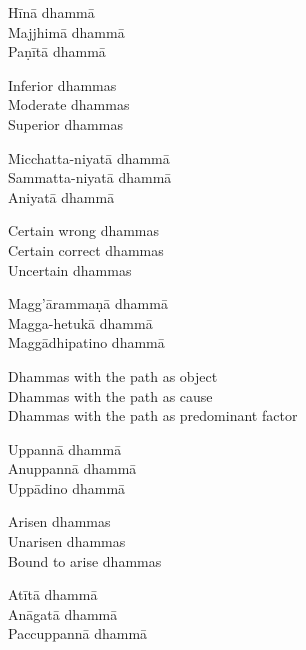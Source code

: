 \begin{pali-hang-continued}
  Hīnā dhammā\\
  Majjhimā dhammā\\
  Paṇītā dhammā
\end{pali-hang-continued}

\begin{english-verses}
  Inferior dhammas\\
  Moderate dhammas\\
  Superior dhammas
\end{english-verses}

\begin{pali-hang-continued}
  Micchatta-niyatā dhammā\\
  Sammatta-niyatā dhammā\\
  Aniyatā dhammā
\end{pali-hang-continued}

\begin{english-verses}
  Certain wrong dhammas\\
  Certain correct dhammas\\
  Uncertain dhammas
\end{english-verses}

\begin{pali-hang-continued}
  Magg'ārammaṇā dhammā\\
  Magga-hetukā dhammā\\
  Maggādhipatino dhammā
\end{pali-hang-continued}

\begin{english-verses}
  Dhammas with the path as object\\
  Dhammas with the path as cause\\
  Dhammas with the path as predominant factor
\end{english-verses}

\begin{pali-hang-continued}
  Uppannā dhammā\\
  Anuppannā dhammā\\
  Uppādino dhammā
\end{pali-hang-continued}

\begin{english-verses}
  Arisen dhammas\\
  Unarisen dhammas\\
  Bound to arise dhammas
\end{english-verses}

\begin{pali-hang-continued}
  Atītā dhammā\\
  Anāgatā dhammā\\
  Paccuppannā dhammā
\end{pali-hang-continued}

